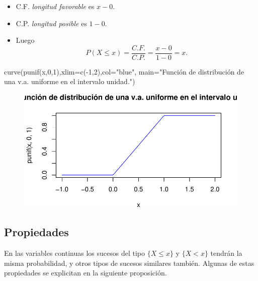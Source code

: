 \documentclass[
  letterpaper,
  DIV=11,
  numbers=noendperiod]{scrreprt}
\newenvironment{Shaded}{\begin{snugshade}}{\end{snugshade}}
\newcommand{\AttributeTok}[1]{\textcolor[rgb]{0.40,0.45,0.13}{#1}}
\newcommand{\DecValTok}[1]{\textcolor[rgb]{0.68,0.00,0.00}{#1}}
\newcommand{\FunctionTok}[1]{\textcolor[rgb]{0.28,0.35,0.67}{#1}}
\newcommand{\NormalTok}[1]{\textcolor[rgb]{0.00,0.23,0.31}{#1}}
\newcommand{\SpecialCharTok}[1]{\textcolor[rgb]{0.37,0.37,0.37}{#1}}
\newcommand{\StringTok}[1]{\textcolor[rgb]{0.13,0.47,0.30}{#1}}
\providecommand{\tightlist}{%
  \setlength{\itemsep}{0pt}\setlength{\parskip}{0pt}}\usepackage{longtable,booktabs,array}
\begin{document}
\begin{itemize}
\tightlist
\item
  C.F. \emph{longitud favorable} es \(x-0\).
\item
  C.P. \emph{longitud posible} es \(1-0\).
\item
  Luego \[P(X\leq x)=\frac{C.F.}{C.P.}=\frac{x-0}{1-0}=x.\]
\end{itemize}

\begin{Shaded}
\begin{Highlighting}[]
\FunctionTok{curve}\NormalTok{(}\FunctionTok{punif}\NormalTok{(x,}\DecValTok{0}\NormalTok{,}\DecValTok{1}\NormalTok{),}\AttributeTok{xlim=}\FunctionTok{c}\NormalTok{(}\SpecialCharTok{{-}}\DecValTok{1}\NormalTok{,}\DecValTok{2}\NormalTok{),}\AttributeTok{col=}\StringTok{"blue"}\NormalTok{,}
      \AttributeTok{main=}\StringTok{"Función de distribución de una v.a. uniforme en el intervalo unidad."}\NormalTok{)}
\end{Highlighting}
\end{Shaded}

\begin{figure}[H]

{\centering \includegraphics{2_files/figure-pdf/figUNIF-1.pdf}

}

\end{figure}

\hypertarget{propiedades-3}{%
\subsection{Propiedades}\label{propiedades-3}}

En las variables continuas los sucesos del tipo \(\{X\leq x \}\) y
\(\{X< x \}\) tendrán la misma probabilidad, y otros tipos de sucesos
similares también. Algunas de estas propiedades se explicitan en la
siguiente proposición.
\end{document}
